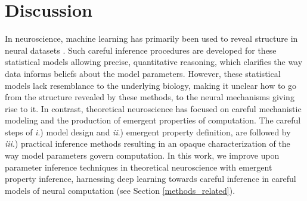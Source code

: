 \documentclass[11pt]{article}
\begin{document}
%

\section{Discussion} 

In neuroscience, machine learning has primarily been used to reveal structure in neural datasets \cite{paninski2018neural}.
Such careful inference procedures are developed for these statistical models allowing precise, quantitative reasoning, which clarifies the way data informs beliefs about the model parameters.  
However, these statistical models lack resemblance to the underlying biology, making it unclear how to go from the structure revealed by these methods, to the neural mechanisms giving rise to it. 
In contrast, theoretical neuroscience has focused on careful mechanistic modeling and the production of emergent properties of computation.  
The careful steps of \emph{i}.) model design and \emph{ii}.) emergent property definition, are followed by \emph{iii}.) practical inference methods resulting in an opaque characterization of the way model parameters govern computation.  
In this work, we improve upon parameter inference techniques in theoretical neuroscience with emergent property inference, harnessing deep learning towards careful inference in careful models of neural computation (see Section \ref{methods_related}).
\end{document}
